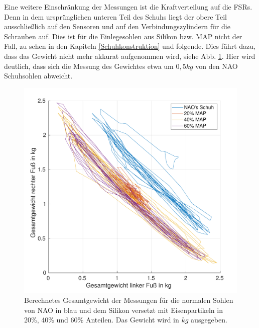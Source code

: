 Eine weitere Einschränkung der Messungen ist die Kraftverteilung auf die FSRs. Denn in dem ursprünglichen unteren Teil des Schuhs liegt der obere Teil ausschließlich auf den Sensoren und auf den Verbindungszylindern für die Schrauben auf. Dies ist für die Einlegesohlen aus Silikon bzw. MAP nicht der Fall, zu sehen in den Kapiteln \ref{Schuhkonstruktion} und folgende. Dies führt dazu, dass das Gewicht nicht mehr akkurat aufgenommen wird, siehe Abb. \ref{total_weight}. Hier wird deutlich, dass sich die Messung des Gewichtes etwa um $0,5 \unit{kg}$ von den NAO Schuhsohlen abweicht. 
\begin{figure}[tb]
	\centering
	\includegraphics[width=0.8\linewidth]{Bilder/TotalWeight_Grund_20_40_60_mean.pdf}
	\caption{Berechnetes Gesamtgewicht der Messungen für die normalen Sohlen von NAO in blau und dem Silikon versetzt mit Eisenpartikeln in 20\%, 40\% und 60\% Anteilen. Das Gewicht wird in $\unit{kg}$ ausgegeben.}
	\label{total_weight}
\end{figure}

